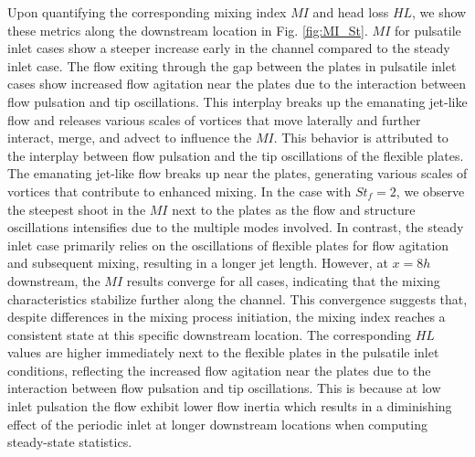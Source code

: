 \documentclass[%
aip,
amsmath,amssymb,
reprint,
]{revtex4-1}
\begin{document}
			Upon quantifying the corresponding mixing index $MI$ and head loss $HL$, we show these metrics along the downstream location in Fig. \ref{fig:MI_St}. $MI$ for pulsatile inlet cases show a steeper increase early in the channel compared to the steady inlet case. The flow exiting through the gap between the plates in pulsatile inlet cases show increased flow agitation near the plates due to the interaction between flow pulsation and tip oscillations. This interplay breaks up the emanating jet-like flow and releases various scales of vortices that move laterally and further interact, merge, and advect to influence the $MI$. This behavior is attributed to the interplay between flow pulsation and the tip oscillations of the flexible plates. The emanating jet-like flow breaks up near the plates, generating various scales of vortices that contribute to enhanced mixing. In the case with $St_f=2$, we observe the steepest shoot in the $MI$ next to the plates as the flow and structure oscillations intensifies due to the multiple modes involved. In contrast, the steady inlet case primarily relies on the oscillations of flexible plates for flow agitation and subsequent mixing, resulting in a longer jet length. However, at $x=8h$ downstream, the $MI$ results converge for all cases, indicating that the mixing characteristics stabilize further along the channel. This convergence suggests that, despite differences in the mixing process initiation, the mixing index reaches a consistent state at this specific downstream location. The corresponding $HL$ values are higher immediately next to the flexible plates in the pulsatile inlet conditions, reflecting the increased flow agitation near the plates due to the interaction between flow pulsation and tip oscillations. This is because at low inlet pulsation the flow exhibit lower flow inertia which results in a diminishing effect of the periodic inlet at longer downstream locations when computing steady-state statistics. 
\end{document}
